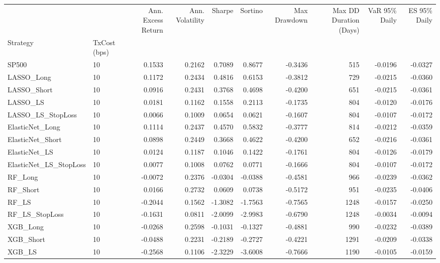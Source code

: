 \begin{tabular}{llrrrrrrrr}
\toprule
 &  & Ann. Excess Return & Ann. Volatility & Sharpe & Sortino & Max Drawdown & Max DD Duration (Days) & VaR 95\% Daily & ES 95\% Daily \\
Strategy & TxCost (bps) &  &  &  &  &  &  &  &  \\
\midrule
SP500 & 10 & 0.1533 & 0.2162 & 0.7089 & 0.8677 & -0.3436 & 515 & -0.0196 & -0.0327 \\
\cline{1-10}
LASSO\_Long & 10 & 0.1172 & 0.2434 & 0.4816 & 0.6153 & -0.3812 & 729 & -0.0215 & -0.0360 \\
\cline{1-10}
LASSO\_Short & 10 & 0.0916 & 0.2431 & 0.3768 & 0.4698 & -0.4200 & 651 & -0.0215 & -0.0361 \\
\cline{1-10}
LASSO\_LS & 10 & 0.0181 & 0.1162 & 0.1558 & 0.2113 & -0.1735 & 804 & -0.0120 & -0.0176 \\
\cline{1-10}
LASSO\_LS\_StopLoss & 10 & 0.0066 & 0.1009 & 0.0654 & 0.0621 & -0.1607 & 804 & -0.0107 & -0.0172 \\
\cline{1-10}
ElasticNet\_Long & 10 & 0.1114 & 0.2437 & 0.4570 & 0.5832 & -0.3777 & 814 & -0.0212 & -0.0359 \\
\cline{1-10}
ElasticNet\_Short & 10 & 0.0898 & 0.2449 & 0.3668 & 0.4622 & -0.4200 & 652 & -0.0216 & -0.0361 \\
\cline{1-10}
ElasticNet\_LS & 10 & 0.0124 & 0.1187 & 0.1046 & 0.1422 & -0.1761 & 804 & -0.0126 & -0.0179 \\
\cline{1-10}
ElasticNet\_LS\_StopLoss & 10 & 0.0077 & 0.1008 & 0.0762 & 0.0771 & -0.1666 & 804 & -0.0107 & -0.0172 \\
\cline{1-10}
RF\_Long & 10 & -0.0072 & 0.2376 & -0.0304 & -0.0388 & -0.4581 & 966 & -0.0239 & -0.0362 \\
\cline{1-10}
RF\_Short & 10 & 0.0166 & 0.2732 & 0.0609 & 0.0738 & -0.5172 & 951 & -0.0235 & -0.0406 \\
\cline{1-10}
RF\_LS & 10 & -0.2044 & 0.1562 & -1.3082 & -1.7563 & -0.7565 & 1248 & -0.0157 & -0.0250 \\
\cline{1-10}
RF\_LS\_StopLoss & 10 & -0.1631 & 0.0811 & -2.0099 & -2.9983 & -0.6790 & 1248 & -0.0034 & -0.0094 \\
\cline{1-10}
XGB\_Long & 10 & -0.0268 & 0.2598 & -0.1031 & -0.1327 & -0.4881 & 990 & -0.0232 & -0.0389 \\
\cline{1-10}
XGB\_Short & 10 & -0.0488 & 0.2231 & -0.2189 & -0.2727 & -0.4221 & 1291 & -0.0209 & -0.0338 \\
\cline{1-10}
XGB\_LS & 10 & -0.2568 & 0.1106 & -2.3229 & -3.6008 & -0.7666 & 1190 & -0.0105 & -0.0159 \\

\end{tabular}
